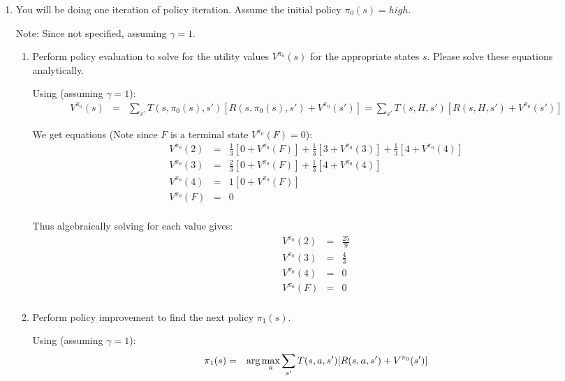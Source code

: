 \documentclass[12pt]{article}
\begin{document}
\begin{enumerate}
\item You will be doing one iteration of policy iteration.  Assume the
  initial policy $\pi_0(s) = high$.

  Note: Since not specified, assuming $\gamma = 1$.

  \begin{enumerate}

 \item Perform policy evaluation to solve for the utility values
  $V^{\pi_0}(s)$ for the appropriate states $s$.  Please solve these
  equations analytically.

  Using (assuming $\gamma = 1$):
  \begin{eqnarray*}
  V^{\pi_0}(s) &=& \sum_{s'} T(s,\pi_0(s),s') [R(s,\pi_0(s),s') + V^{\pi_0}(s')] = \sum_{s'} T(s,H,s') [R(s,H,s') + V^{\pi_0}(s')]
  \end{eqnarray*}

  We get equations (Note since $F$ is a terminal state $V^{\pi_0}(F)=0$): 
  \begin{eqnarray*}
  V^{\pi_0}(2) &=& \frac{1}{3}[0 + V^{\pi_0}(F)] + \frac{1}{3}[3 + V^{\pi_0}(3)] + \frac{1}{3}[4 + V^{\pi_0}(4)] \\[.1in]
  V^{\pi_0}(3) &=& \frac{2}{3}[0 + V^{\pi_0}(F)] + \frac{1}{3}[4 + V^{\pi_0}(4)] \\[.1in]
  V^{\pi_0}(4) &=& 1[0 + V^{\pi_0}(F)] \\[.1in]
  V^{\pi_0}(F) &=& 0 \\[.1in]
  \end{eqnarray*}

  Thus algebraically solving for each value gives:
  \begin{eqnarray*}
  V^{\pi_0}(2) &=& \frac{25}{9}\\[.1in]
  V^{\pi_0}(3) &=& \frac{4}{3} \\[.1in]
  V^{\pi_0}(4) &=& 0 \\[.1in]
  V^{\pi_0}(F) &=& 0 \\[.1in]
  \end{eqnarray*}

  \item Perform policy improvement to find the next policy $\pi_1(s)$.

  Using (assuming $\gamma = 1$):
  \begin{eqnarray*}
  \pi_{1}(s)     &=& \hbox{arg} \max_a \sum_{s'} T(s,a,s') [R(s,a,s') + V^{\pi_0}(s')] 
  \end{eqnarray*}


\end{enumerate}
\end{enumerate}
\end{document}
